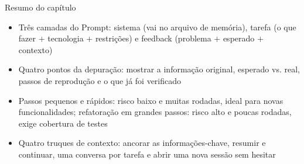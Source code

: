 \begin{tcbsummary}{Resumo do capítulo}
\begin{itemize}
  \item Três camadas do Prompt: sistema (vai no arquivo de memória), tarefa (o que fazer + tecnologia + restrições) e feedback (problema + esperado + contexto)
  \item Quatro pontos da depuração: mostrar a informação original, esperado vs. real, passos de reprodução e o que já foi verificado
  \item Passos pequenos e rápidos: risco baixo e muitas rodadas, ideal para novas funcionalidades; refatoração em grandes passos: risco alto e poucas rodadas, exige cobertura de testes
  \item Quatro truques de contexto: ancorar as informações-chave, resumir e continuar, uma conversa por tarefa e abrir uma nova sessão sem hesitar
\end{itemize}

\end{tcbsummary}
